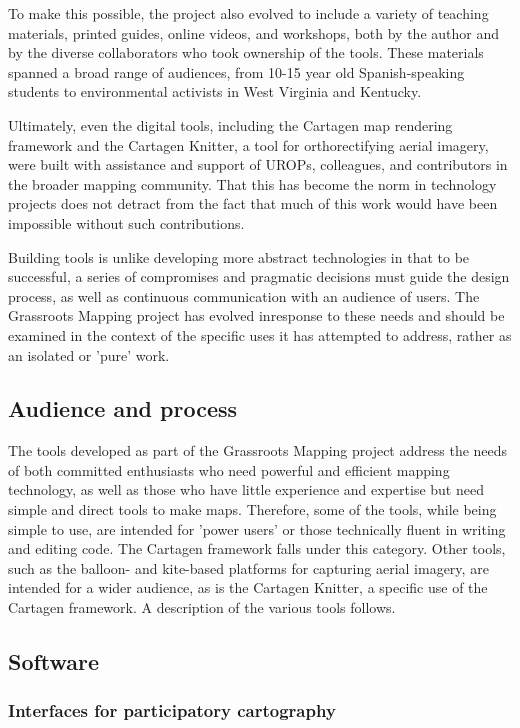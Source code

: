 \documentclass[11pt]{report}
\begin{document}
To make this possible, the project also evolved to include a variety of teaching materials, printed guides, online videos, and workshops, both by the author and by the diverse collaborators who took ownership of the tools. These materials spanned a broad range of audiences, from 10-15 year old Spanish-speaking students to environmental activists in West Virginia and Kentucky. 

Ultimately, even the digital tools, including the Cartagen map rendering framework and the Cartagen Knitter, a tool for orthorectifying aerial imagery, were built with assistance and support of UROPs, colleagues, and contributors in the broader mapping community. That this has become the norm in technology projects does not detract from the fact that much of this work would have been impossible without such contributions. 

Building tools is unlike developing more abstract technologies in that to be successful, a series of compromises and pragmatic decisions must guide the design process, as well as continuous communication with an audience of users. The Grassroots Mapping project has evolved inresponse to these needs and should be examined in the context of the specific uses it has attempted to address, rather as an isolated or 'pure' work.

\subsection{Audience and process}

The tools developed as part of the Grassroots Mapping project address the needs of both committed enthusiasts who need powerful and efficient mapping technology, as well as those who have little experience and expertise but need simple and direct tools to make maps. Therefore, some of the tools, while being simple to use, are intended for 'power users' or those technically fluent in writing and editing code. The Cartagen framework falls under this category. Other tools, such as the balloon- and kite-based platforms for capturing aerial imagery, are intended for a wider audience, as is the Cartagen Knitter, a specific use of the Cartagen framework. A description of the various tools follows.

\subsection{Software}

\subsubsection{Interfaces for participatory cartography}
\end{document}
